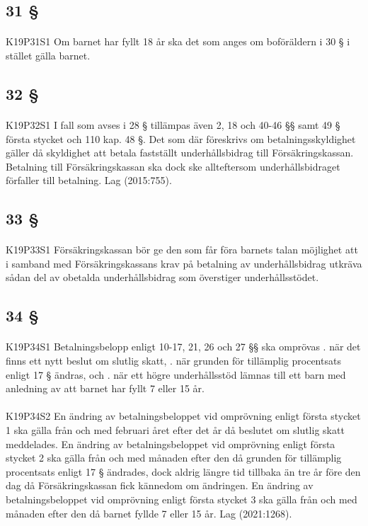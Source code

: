\documentclass[a4paper,notitlepage,openany,10pt]{book}
\begin{document}
\subsection*{31 §}
\paragraph*{}
{\tiny K19P31S1}
Om barnet har fyllt 18 år ska det som anges om boföräldern i 30 § i stället gälla barnet.
\subsection*{32 §}
\paragraph*{}
{\tiny K19P32S1}
I fall som avses i 28 § tillämpas även 2, 18 och 40-46 §§ samt 49 § första stycket och 110 kap. 48 §. Det som där föreskrivs om betalningsskyldighet gäller då skyldighet att betala fastställt underhållsbidrag till Försäkringskassan. Betalning till Försäkringskassan ska dock ske allteftersom underhållsbidraget förfaller till betalning.
Lag (2015:755).
\subsection*{33 §}
\paragraph*{}
{\tiny K19P33S1}
Försäkringskassan bör ge den som får föra barnets talan möjlighet att i samband med Försäkringskassans krav på betalning av underhållsbidrag utkräva sådan del av obetalda underhållsbidrag som överstiger underhållsstödet.
\subsection*{34 §}
\paragraph*{}
{\tiny K19P34S1}
Betalningsbelopp enligt 10-17, 21, 26 och 27 §§ ska omprövas
. när det finns ett nytt beslut om slutlig skatt,
. när grunden för tillämplig procentsats enligt 17 § ändras, och
. när ett högre underhållsstöd lämnas till ett barn med anledning av att barnet har fyllt 7 eller 15 år.
\paragraph*{}
{\tiny K19P34S2}
En ändring av betalningsbeloppet vid omprövning enligt första stycket 1 ska gälla från och med februari året efter det år då beslutet om slutlig skatt meddelades. En ändring av betalningsbeloppet vid omprövning enligt första stycket 2 ska gälla från och med månaden efter den då grunden för tillämplig procentsats enligt 17 § ändrades, dock aldrig längre tid tillbaka än tre år före den dag då Försäkringskassan fick kännedom om ändringen. En ändring av betalningsbeloppet vid omprövning enligt första stycket 3 ska gälla från och med månaden efter den då barnet fyllde 7 eller 15 år.
Lag (2021:1268).
\end{document}
